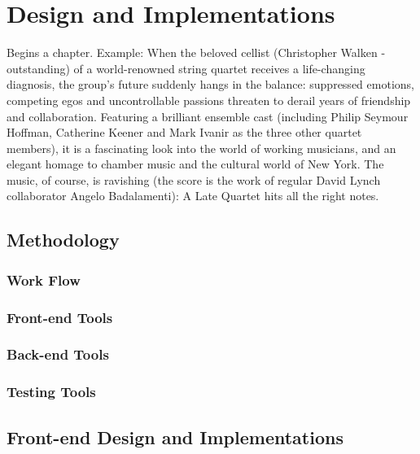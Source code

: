 %
%
\chapter{Design and Implementations}
\label{chap:D&I}

Begins a chapter. Example: When the beloved cellist (Christopher Walken - outstanding) of a world-renowned string quartet receives a life-changing diagnosis, the group's future suddenly hangs in the balance: suppressed emotions, competing egos and uncontrollable passions threaten to derail years of friendship and collaboration. Featuring a brilliant ensemble cast (including Philip Seymour Hoffman, Catherine Keener and Mark Ivanir as the three other quartet members), it is a fascinating look into the world of working musicians, and an elegant homage to chamber music and the cultural world of New York. The music, of course, is ravishing (the score is the work of regular David Lynch collaborator Angelo Badalamenti): A Late Quartet hits all the right notes.

\section{Methodology}
\label{sec:sec01}

\subsection{Work Flow}
\label{subsec:subsec01}

\subsection{Front-end Tools}
\label{subsec:FETools}


\subsection{Back-end Tools}
\label{subsec:subsec04}

\subsection{Testing Tools}
\label{subsec:subsec05}

\section{Front-end Design and Implementations}
\label{sec:sec02}

